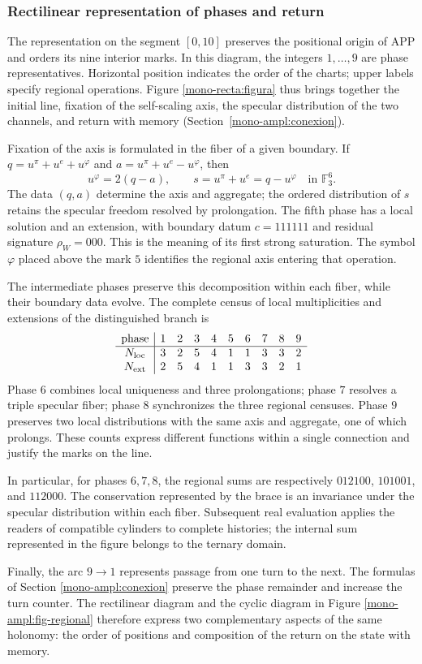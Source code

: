 \subsubsection{Rectilinear representation of phases and return}
\label{mono-recta:desarrollo}

The representation on the segment \([0,10]\) preserves the positional
origin of APP and orders its nine interior marks. In this diagram,
the integers \(1,\ldots,9\) are phase representatives. Horizontal
position indicates the order of the charts; upper labels
specify regional operations. Figure
\ref{mono-recta:figura} thus brings together the initial line, fixation of the
self-scaling axis, the specular distribution of the two channels, and
return with memory (Section~\ref{mono-ampl:conexion}).



Fixation of the axis is formulated in the fiber of a given boundary. If
\(q=u^\pi+u^e+u^\varphi\) and
\(a=u^\pi+u^e-u^\varphi\), then
\[
 u^\varphi=2(q-a),\qquad s=u^\pi+u^e=q-u^\varphi
 \quad\text{in }\mathbb F_3^6.
\]
The data \((q,a)\) determine the axis and aggregate; the ordered distribution
of \(s\) retains the specular freedom resolved by prolongation.
The fifth phase has a local solution and an extension, with boundary
datum \(c=111111\) and residual signature \(\rho_W=000\). This is the
meaning of its first strong saturation. The symbol \(\varphi\)
placed above the mark \(5\) identifies the regional axis entering
that operation.

The intermediate phases preserve this decomposition within each fiber,
while their boundary data evolve. The complete census of local
multiplicities and extensions of the distinguished branch is
\[
\begin{array}{c|rrrrrrrrr}
\text{phase}&1&2&3&4&5&6&7&8&9\\\hline
N_{\rm loc}&3&2&5&4&1&1&3&3&2\\
N_{\rm ext}&2&5&4&1&1&3&3&2&1
\end{array}
\]
Phase \(6\) combines local uniqueness and three prolongations; phase
\(7\) resolves a triple specular fiber; phase \(8\) synchronizes
the three regional censuses. Phase \(9\) preserves two local
distributions with the same axis and aggregate, one of which
prolongs. These counts express different functions within a
single connection and justify the marks on the line.

In particular, for phases \(6,7,8\), the regional sums are
respectively \(012100\), \(101001\), and \(112000\). The conservation
represented by the brace is an invariance under the specular
distribution within each fiber. Subsequent real evaluation applies the
readers of compatible cylinders to complete histories; the
internal sum represented in the figure belongs to the ternary domain.

Finally, the arc \(9\to1\) represents passage from one turn to the
next. The formulas of Section
\ref{mono-ampl:conexion} preserve the phase remainder and increase the
turn counter. The rectilinear diagram and the cyclic diagram in
Figure \ref{mono-ampl:fig-regional} therefore express two complementary
aspects of the same holonomy: the order of positions and
composition of the return on the state with memory.
